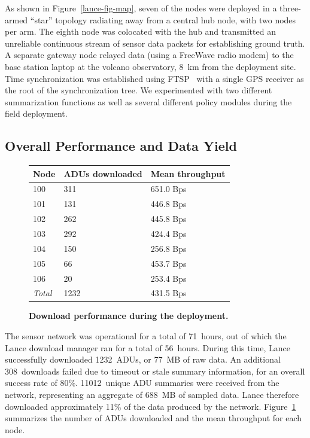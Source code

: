 As shown in Figure~\ref{lance-fig-map}, seven of the nodes were deployed in a
three-armed ``star'' topology radiating away from a central hub node, with
two nodes per arm. The eighth node was colocated with the hub and transmitted
an unreliable continuous stream of sensor data packets for establishing
ground truth. A separate gateway node relayed data (using a FreeWave radio
modem) to the base station laptop at the volcano observatory, 8~km from the
deployment site. Time synchronization was established using FTSP~\cite{ftsp}
with a single GPS receiver as the root of the synchronization tree. We
experimented with two different summarization functions as well as several
different policy modules during the field deployment.

\subsection{Overall Performance and Data Yield}

\begin{figure}[t]
\begin{center}
\begin{tabular}{|l|l|l|} \hline
\textbf{Node}	& \textbf{ADUs downloaded} & \textbf{Mean throughput} \\ \hline
100 & 311 & 651.0 Bps \\
101 & 131 & 446.8 Bps \\
102 & 262 & 445.8 Bps \\
103 & 292 & 424.4 Bps \\
104 & 150 & 256.8 Bps \\
105 & 66 & 453.7 Bps \\
106 & 20 & 253.4 Bps \\ \hline
\textit{Total} & 1232 & 431.5 Bps \\ \hline
\end{tabular}
\end{center}

\caption{\textbf{Download performance during the deployment.}}

\label{lance-fig-throughput}
\end{figure}

The sensor network was operational for a total of 71~hours, out of which the
Lance download manager ran for a total of 56~hours. During this time, Lance
successfully downloaded 1232~ADUs, or 77~MB of raw data. An additional
308~downloads failed due to timeout or stale summary information, for an
overall success rate of 80\%. 11012~unique ADU summaries were received from
the network, representing an aggregate of 688~MB of sampled data. Lance
therefore downloaded approximately 11\% of the data produced by the network.
Figure~\ref{lance-fig-throughput} summarizes the number of ADUs downloaded
and the mean throughput for each node.

